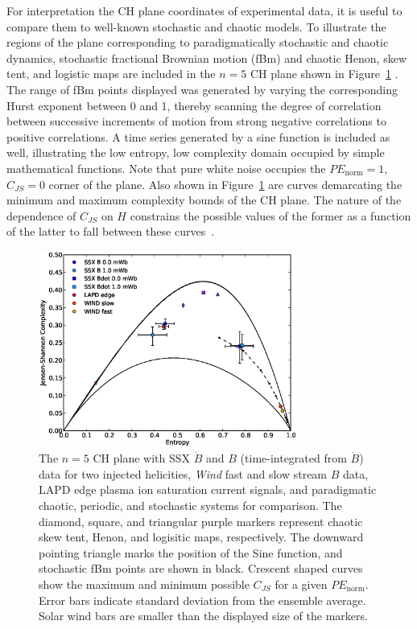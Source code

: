 \documentclass[aps,prx,twocolumn,secnumarabic,nobalancelastpage,amsmath,amssymb,
nofootinbib]{revtex4-1}
\begin{document}
For interpretation the CH plane coordinates of experimental data, it is useful to compare them to well-known stochastic and chaotic models. To illustrate the regions of the plane corresponding to paradigmatically stochastic and chaotic dynamics, stochastic fractional Brownian motion (fBm) and chaotic Henon, skew tent, and logistic maps are included in the $n=5$ CH plane shown in Figure~\ref{fig:CHplane} \cite{rosso2007}. The range of fBm points displayed was generated by varying the corresponding Hurst exponent between 0 and 1, thereby scanning the degree of correlation between successive increments of motion from strong negative correlations to positive correlations. A time series generated by a sine function is included as well, illustrating the low entropy, low complexity domain occupied by simple mathematical functions. Note that pure white noise occupies the $PE_{\text{norm}}=1$, $C_{JS}=0$ corner of the plane. Also shown in Figure~\ref{fig:CHplane} are curves demarcating the minimum and maximum complexity bounds of the CH plane. The nature of the dependence of $C_{JS}$ on $H$ constrains the possible values of the former as a function of the latter to fall between these curves~\cite{lopez1995,calbet2001}.
%
\begin{figure}[!htbp]
\centerline{
\includegraphics[width=8.5cm]{figure1.eps}}
\caption{\label{fig:CHplane} The $n=5$ CH plane  with SSX $\dot{B}$ and $B$ (time-integrated from $\dot{B}$) data for two injected helicities, \textit{Wind} fast and slow stream $B$ data, LAPD edge plasma ion saturation current signals, and paradigmatic chaotic, periodic, and stochastic systems for comparison. The diamond, square, and triangular purple markers represent chaotic skew tent, Henon, and logisitic maps, respectively. The downward pointing triangle marks the position of the Sine function, and stochastic fBm points are shown in black. Crescent shaped curves show the maximum and minimum possible $C_{JS}$ for a given $PE_{\text{norm}}$. Error bars indicate standard deviation from the ensemble average. Solar wind bars are smaller than the displayed size of the markers.}
\end{figure}
\end{document}
